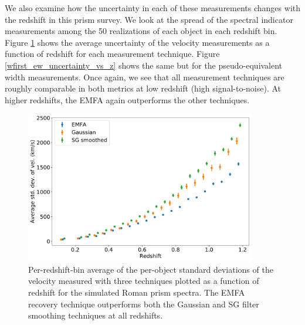 We also examine how the uncertainty in each of these measurements changes with the redshift in this prism survey. We look at the spread of the spectral indicator measurements among the 50 realizations of each object in each redshift bin. Figure \ref{wfirst_vel_uncertainty_vs_z} shows the average uncertainty of the velocity measurements as a function of redshift for each measurement technique. Figure \ref{wfirst_ew_uncertainty_vs_z} shows the same but for the pseudo-equivalent width measurements. Once again, we see that all measurement techniques are roughly comparable in both metrics at low redshift (high signal-to-noise). At higher redshifts, the EMFA again outperforms the other techniques.

\begin{figure}[htbp]
    \centering
    \includegraphics[width=0.9\textwidth]{figures/si_feat_pca/wfirst_vel_uncert.pdf}
    \caption{Per-redshift-bin average of the per-object standard deviations of the velocity measured with three techniques plotted as a function of redshift for the simulated Roman prism spectra. The EMFA recovery technique outperforms both the Gaussian and SG filter smoothing techniques at all redshifts.}
    \label{wfirst_vel_uncertainty_vs_z}
\end{figure}

